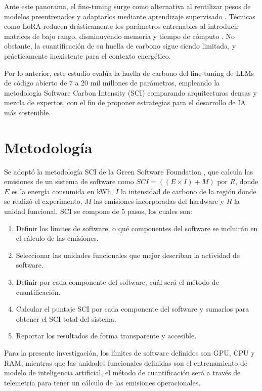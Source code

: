 \documentclass[twocolumn]{article}
\begin{document}
{Ante este panorama, el fine-tuning surge como alternativa al reutilizar pesos de modelos preentrenados y adaptarlos mediante aprendizaje supervisado \cite{ibmfinetuning}. Técnicas como LoRA reducen drásticamente los parámetros entrenables al introducir matrices de bajo rango, disminuyendo memoria y tiempo de cómputo \cite{Lora,PEFTHugging}. No obstante, la cuantificación de su huella de carbono sigue siendo limitada, y prácticamente inexistente para el contexto energético.}

{Por lo anterior, este estudio evalúa la huella de carbono del fine-tuning de LLMs de código abierto de 7 a 20 mil millones de parámetros, empleando la metodología Software Carbon Intensity (SCI) \cite{greensoftwarefoundation_sci2025} comparando arquitecturas densas y mezcla de expertos, con el fin de proponer estrategias para el desarrollo de IA más sostenible.}

\section{Metodología}

{Se adoptó la metodología SCI de la Green Software Foundation \cite{greensoftwarefoundation_sci2025}, que calcula las emisiones de un sistema de software como $SCI = ((E \times I) + M)$ por $R$, donde $E$ es la energía consumida en kWh, $I$ la intensidad de carbono de la región donde se realizó el experimento, $M$ las emisiones incorporadas del hardware y $R$ la unidad funcional. SCI se compone de 5 pasos, los cuales son:}

\begin{enumerate}
    \item Definir los límites de software, o qué componentes del software se incluirán en el cálculo de las emisiones.
    \item Seleccionar las unidades funcionales que mejor describan la actividad de software.
    \item Definir por cada componente del software, cuál será el método de cuantificación.
    \item Calcular el puntaje SCI por cada componente del software y sumarlos para obtener el SCI total del sistema.
    \item Reportar los resultados de forma transparente y accesible.
\end{enumerate}

{Para la presente investigación, los límites de software definidos son GPU, CPU y RAM, mientras que las unidades funcionales definidas son el entrenamiento de modelo de inteligencia artificial, el método de cuantificación será a través de telemetría para tener un cálculo de las emisiones operacionales.}
\end{document}
